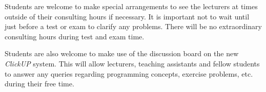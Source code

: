         Students are welcome to make special arrangements to see the
        lecturers at times outside of their consulting hours if
        necessary. It is important not to wait until just before a
        test or exam to clarify any problems. There will be no
        extraordinary consulting hours during test and exam time.

        Students are also welcome to make use of the discussion board
        on the new {\it ClickUP} system. This will allow lecturers,
        teaching assistants and fellow students to answer any queries
        regarding programming concepts, exercise problems, etc. during
        their free time.

